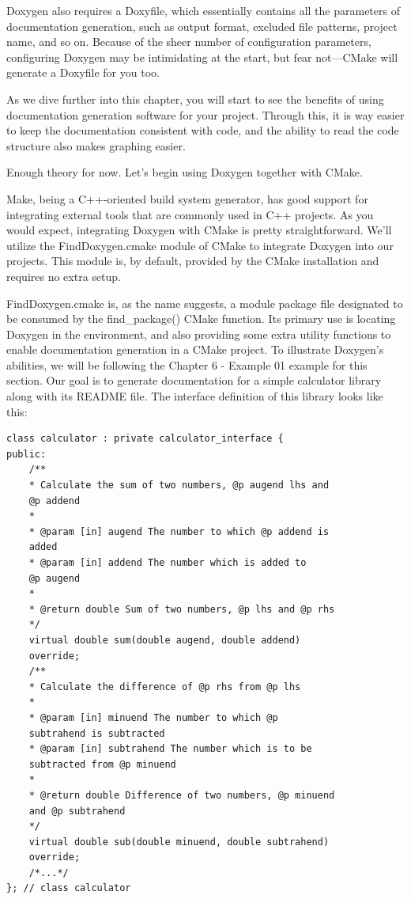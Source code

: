 Doxygen also requires a Doxyfile, which essentially contains all the parameters of documentation generation, such as output format, excluded file patterns, project name, and so on. Because of the sheer number of configuration parameters, configuring Doxygen may be intimidating at the start, but fear not—CMake will generate a Doxyfile for you too.

As we dive further into this chapter, you will start to see the benefits of using documentation generation software for your project. Through this, it is way easier to keep the documentation consistent with code, and the ability to read the code structure also makes graphing easier.

Enough theory for now. Let's begin using Doxygen together with CMake.


Make, being a C++-oriented build system generator, has good support for integrating external tools that are commonly used in C++ projects. As you would expect, integrating Doxygen with CMake is pretty straightforward. We'll utilize the FindDoxygen.cmake module of CMake to integrate Doxygen into our projects. This module is, by default, provided by the CMake installation and requires no extra setup.

FindDoxygen.cmake is, as the name suggests, a module package file designated to be consumed by the find\_package() CMake function. Its primary use is locating Doxygen in the environment, and also providing some extra utility functions to enable documentation generation in a CMake project. To illustrate Doxygen's abilities, we will be following the Chapter 6 - Example 01 example for this section. Our goal is to generate documentation for a simple calculator library along with its README file. The interface definition of this library looks like this:

\begin{lstlisting}[style=styleCXX]
class calculator : private calculator_interface {
public:
	/**
	* Calculate the sum of two numbers, @p augend lhs and
	@p addend
	*
	* @param [in] augend The number to which @p addend is
	added
	* @param [in] addend The number which is added to
	@p augend
	*
	* @return double Sum of two numbers, @p lhs and @p rhs
	*/
	virtual double sum(double augend, double addend)
	override;
	/**
	* Calculate the difference of @p rhs from @p lhs
	*
	* @param [in] minuend The number to which @p
	subtrahend is subtracted
	* @param [in] subtrahend The number which is to be
	subtracted from @p minuend
	*
	* @return double Difference of two numbers, @p minuend
	and @p subtrahend
	*/
	virtual double sub(double minuend, double subtrahend)
	override;
	/*...*/
}; // class calculator
\end{lstlisting}

